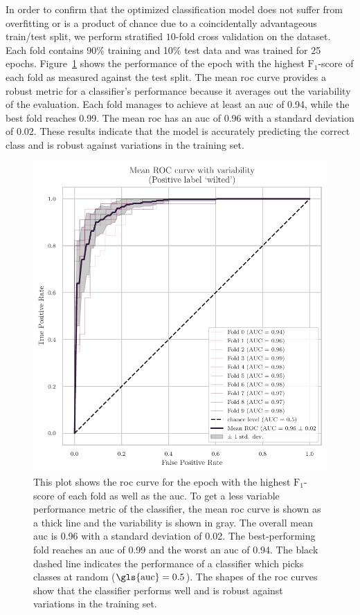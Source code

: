 \documentclass[final]{vutinfth} %
\begin{document}
In order to confirm that the optimized classification model does not
suffer from overfitting or is a product of chance due to a
coincidentally advantageous train/test split, we perform stratified
$10$-fold cross validation on the dataset. Each fold contains 90\%
training and 10\% test data and was trained for \num{25}
epochs. Figure~\ref{fig:classifier-hyp-roc} shows the performance of
the epoch with the highest $\mathrm{F}_1$-score of each fold as
measured against the test split. The mean \gls{roc} curve provides a
robust metric for a classifier's performance because it averages out
the variability of the evaluation. Each fold manages to achieve at
least an \gls{auc} of \num{0.94}, while the best fold reaches
\num{0.99}. The mean \gls{roc} has an \gls{auc} of \num{0.96} with a
standard deviation of \num{0.02}. These results indicate that the
model is accurately predicting the correct class and is robust against
variations in the training set.

\begin{figure}
  \centering
  \includegraphics{graphics/classifier-hyp-folds-roc.pdf}
  \caption[Mean \gls{roc} and variability of hyperparameter-optimized
  model.]{This plot shows the \gls{roc} curve for the epoch with the
    highest $\mathrm{F}_1$-score of each fold as well as the
    \gls{auc}. To get a less variable performance metric of the
    classifier, the mean \gls{roc} curve is shown as a thick line and
    the variability is shown in gray. The overall mean \gls{auc} is
    \num{0.96} with a standard deviation of \num{0.02}. The
    best-performing fold reaches an \gls{auc} of \num{0.99} and the
    worst an \gls{auc} of \num{0.94}. The black dashed line indicates
    the performance of a classifier which picks classes at random
    ($\mathrm{\gls{auc}} = 0.5$). The shapes of the \gls{roc} curves
    show that the classifier performs well and is robust against
    variations in the training set.}
  \label{fig:classifier-hyp-roc}
\end{figure}
\end{document}
